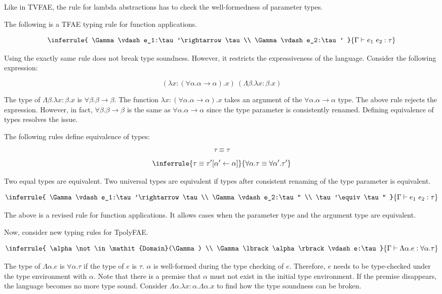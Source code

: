 Like in TVFAE, the rule for lambda abstractions has to check the well-formedness
of parameter types.

The following is a TFAE typing rule for function applications.

\[
\inferrule
{ \Gamma\vdash e_1:\tau'\rightarrow\tau \\
  \Gamma\vdash e_2:\tau' }
{ \Gamma\vdash e_1\ e_2:\tau }
\]

Using the exactly same rule does not break type soundness. However, it restricts
the expressiveness of the language. Consider the following expression:

\[(\lambda x:(\forall\alpha.\alpha\rightarrow\alpha).x)\ (\Lambda\beta.\lambda
x:\beta.x)\]

The type of $\Lambda\beta.\lambda x:\beta.x$ is
$\forall\beta.\beta\rightarrow\beta$. The function \(\lambda
x:(\forall\alpha.\alpha\rightarrow\alpha).x\) takes an argument of the
$\forall\alpha.\alpha\rightarrow\alpha$ type. The above rule rejects the
expression. However, in fact, $\forall\beta.\beta\rightarrow\beta$ is the same
as $\forall\alpha.\alpha\rightarrow\alpha$ since the type parameter is
consistently renamed. Defining equivalence of types resolves the issue.

The following rules define equivalence of types:

\[
\tau\equiv\tau
\]

\[
\inferrule
{ \tau\equiv\tau'\lbrack\alpha'\leftarrow\alpha\rbrack }
{ \forall\alpha.\tau\equiv\forall\alpha'.\tau' }
\]

Two equal types are equivalent. Two universal types are equivalent if types
after consistent renaming of the type parameter is equivalent.

\[
\inferrule
{ \Gamma\vdash e_1:\tau'\rightarrow\tau \\
  \Gamma\vdash e_2:\tau'' \\
  \tau'\equiv\tau'' }
{ \Gamma\vdash e_1\ e_2:\tau }
\]

The above is a revised rule for function applications. It allows cases when the
parameter type and the argument type are equivalent.

Now, consider new typing rules for TpolyFAE.

\[
\inferrule
{ \alpha\not\in\mathit{Domain}(\Gamma) \\
  \Gamma\lbrack\alpha\rbrack\vdash e:\tau }
{ \Gamma\vdash \Lambda \alpha.e:\forall\alpha.\tau }
\]

The type of $\Lambda\alpha.e$ is $\forall\alpha.\tau$ if the type of $e$
is $\tau$. $\alpha$ is well-formed during the type checking of $e$.
Therefore, $e$ needs to be type-checked under the type environment with
$\alpha$. Note that there is a premise that $\alpha$ must not exist in the
initial type environment. If the premise disappears, the language becomes no
more type sound. Consider $\Lambda\alpha.\lambda x:\alpha.\Lambda\alpha.x$ to
find how the type soundness can be broken.

